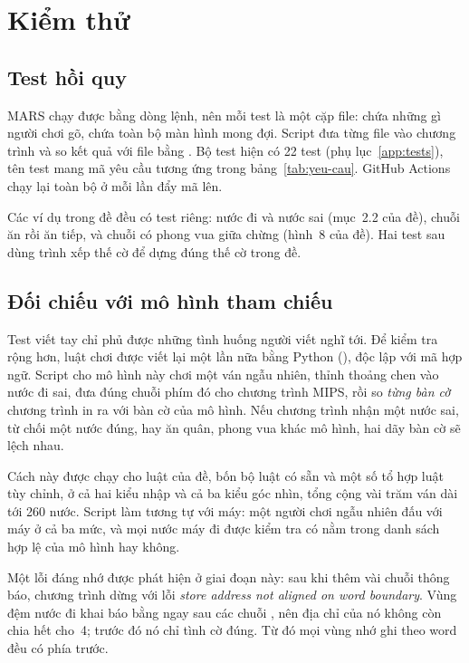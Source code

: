 \chapter{Kiểm thử}

\section{Test hồi quy}

MARS chạy được bằng dòng lệnh, nên mỗi test là một cặp file:  chứa những gì người chơi gõ,  chứa toàn bộ màn hình mong đợi. Script  đưa từng file  vào chương trình và so kết quả với file  bằng . Bộ test hiện có 22 test (phụ lục~\ref{app:tests}), tên test mang mã yêu cầu tương ứng trong bảng~\ref{tab:yeu-cau}. GitHub Actions chạy lại toàn bộ ở mỗi lần đẩy mã lên.

Các ví dụ trong đề đều có test riêng: nước đi  và nước sai  (mục~2.2 của đề), chuỗi ăn  rồi ăn tiếp, và chuỗi  có phong vua giữa chừng (hình~8 của đề). Hai test sau dùng trình xếp thế cờ để dựng đúng thế cờ trong đề.

\section{Đối chiếu với mô hình tham chiếu}

Test viết tay chỉ phủ được những tình huống người viết nghĩ tới. Để kiểm tra rộng hơn, luật chơi được viết lại một lần nữa bằng Python (), độc lập với mã hợp ngữ. Script  cho mô hình này chơi một ván ngẫu nhiên, thỉnh thoảng chen vào nước đi sai, đưa đúng chuỗi phím đó cho chương trình MIPS, rồi so \emph{từng bàn cờ} chương trình in ra với bàn cờ của mô hình. Nếu chương trình nhận một nước sai, từ chối một nước đúng, hay ăn quân, phong vua khác mô hình, hai dãy bàn cờ sẽ lệch nhau.

Cách này được chạy cho luật của đề, bốn bộ luật có sẵn và một số tổ hợp luật tùy chỉnh, ở cả hai kiểu nhập và cả ba kiểu góc nhìn, tổng cộng vài trăm ván dài tới 260 nước. Script  làm tương tự với máy: một người chơi ngẫu nhiên đấu với máy ở cả ba mức, và mọi nước máy đi được kiểm tra có nằm trong danh sách hợp lệ của mô hình hay không.

Một lỗi đáng nhớ được phát hiện ở giai đoạn này: sau khi thêm vài chuỗi thông báo, chương trình dừng với lỗi \emph{store address not aligned on word boundary}. Vùng đệm nước đi khai báo bằng  ngay sau các chuỗi , nên địa chỉ của nó không còn chia hết cho~4; trước đó nó chỉ tình cờ đúng. Từ đó mọi vùng nhớ ghi theo word đều có  phía trước.

